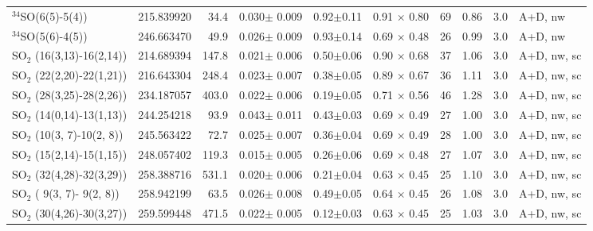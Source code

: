 \documentclass{aa}
\begin{document}
\begin{sidewaystable*}
\begin{center}
\begin{tabular}{llrrrrlcrl}
$^{34}$SO(6(5)-5(4))         & 215.839920 &  34.4 &  0.030$\pm$ 0.009 & 0.92$\pm$0.11 & 0.91 $\times$ 0.80 & 69  &    0.86                 &    3.0  & A+D, nw                              \\ %
$^{34}$SO(5(6)-4(5))         & 246.663470 &  49.9 &  0.026$\pm$ 0.009 & 0.93$\pm$0.14 & 0.69 $\times$ 0.48 & 26  &    0.99                 &    3.0  & A+D, nw                              \\ %
\hline			                                                     
SO$_2$ (16(3,13)-16(2,14))  & 214.689394 & 147.8 & 0.021$\pm$ 0.006 & 0.50$\pm$0.06 & 0.90 $\times$ 0.68 & 37  &    1.06                 &    3.0  & A+D, nw, sc                          \\
SO$_2$ (22(2,20)-22(1,21))  & 216.643304 & 248.4 & 0.023$\pm$ 0.007 & 0.38$\pm$0.05 & 0.89 $\times$ 0.67 & 36  &    1.11                 &    3.0  & A+D, nw, sc                          \\
SO$_2$ (28(3,25)-28(2,26))  & 234.187057 & 403.0 & 0.022$\pm$ 0.006 & 0.19$\pm$0.05 & 0.71 $\times$ 0.56 & 46  &    1.28                 &    3.0  & A+D, nw, sc                          \\
SO$_2$ (14(0,14)-13(1,13))  & 244.254218 &  93.9 & 0.043$\pm$ 0.011 & 0.43$\pm$0.03 & 0.69 $\times$ 0.49 & 27  &    1.00                 &    3.0  & A+D, nw, sc                          \\
SO$_2$ (10(3, 7)-10(2, 8))  & 245.563422 &  72.7 & 0.025$\pm$ 0.007 & 0.36$\pm$0.04 & 0.69 $\times$ 0.49 & 28  &    1.00                 &    3.0  & A+D, nw, sc                          \\
SO$_2$ (15(2,14)-15(1,15))  & 248.057402 & 119.3 & 0.015$\pm$ 0.005 & 0.26$\pm$0.06 & 0.69 $\times$ 0.48 & 27  &    1.07                 &    3.0  & A+D, nw, sc                          \\
SO$_2$ (32(4,28)-32(3,29))  & 258.388716 & 531.1 & 0.020$\pm$ 0.006 & 0.21$\pm$0.04 & 0.63 $\times$ 0.45 & 25  &    1.10                 &    3.0  & A+D, nw, sc                          \\
SO$_2$ ( 9(3, 7)- 9(2, 8))  & 258.942199 &  63.5 & 0.026$\pm$ 0.008 & 0.49$\pm$0.05 & 0.64 $\times$ 0.45 & 26  &    1.08                 &    3.0  & A+D, nw, sc                          \\
SO$_2$ (30(4,26)-30(3,27))  & 259.599448 & 471.5 & 0.022$\pm$ 0.005 & 0.12$\pm$0.03 & 0.63 $\times$ 0.45 & 25  &    1.03                 &    3.0  & A+D, nw, sc                          \\

\end{tabular}
\end{center}
\end{sidewaystable*}
\end{document}
